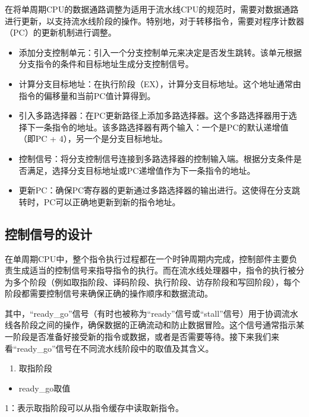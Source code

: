 在将单周期CPU的数据通路调整为适用于流水线CPU的规范时，需要对数据通路进行更新，以支持流水线阶段的操作。特别地，对于转移指令，需要对程序计数器（PC）的更新机制进行调整。

\begin{itemize}
\item
  添加分支控制单元：引入一个分支控制单元来决定是否发生跳转。该单元根据分支指令的条件和目标地址生成分支控制信号。
\item
  计算分支目标地址：在执行阶段（EX），计算分支目标地址。这个地址通常由指令的偏移量和当前PC值计算得到。
\item
  引入多路选择器：在PC更新路径上添加多路选择器。这个多路选择器用于选择下一条指令的地址。该多路选择器有两个输入：一个是PC的默认递增值（即PC + 4），另一个是分支目标地址。
\item
  控制信号：将分支控制信号连接到多路选择器的控制输入端。根据分支条件是否满足，选择分支目标地址或PC递增值作为下一条指令的地址。
\item
  更新PC：确保PC寄存器的更新通过多路选择器的输出进行。这使得在分支跳转时，PC可以正确地更新到新的指令地址。
\end{itemize}

\subsection{控制信号的设计}\label{sec:05-simple-cpu-011}

在单周期CPU中，整个指令执行过程都在一个时钟周期内完成，控制部件主要负责生成适当的控制信号来指导指令的执行。而在流水线处理器中，指令的执行被分为多个阶段（例如取指阶段、译码阶段、执行阶段、访存阶段和写回阶段），每个阶段都需要控制信号来确保正确的操作顺序和数据流动。

其中，``ready\_go''信号（有时也被称为``ready''信号或``stall''信号）用于协调流水线各阶段之间的操作，确保数据的正确流动和防止数据冒险。这个信号通常指示某一阶段是否准备好接受新的指令或数据，或者是否需要等待。接下来我们来看``ready\_go''信号在不同流水线阶段中的取值及其含义。

\begin{enumerate}
\def\labelenumi{\arabic{enumi}.}
\tightlist
\item
  取指阶段
\end{enumerate}

\begin{itemize}
\tightlist
\item
  ready\_go取值
\end{itemize}

1：表示取指阶段可以从指令缓存中读取新指令。

